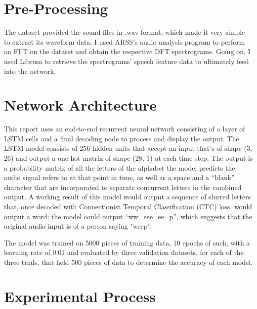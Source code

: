 \section{Pre-Processing}

The dataset provided the sound files in .wav format, which made it very simple to extract its waveform data. I used ARSS’s audio analysis program to perform an FFT on the dataset and obtain the respective DFT spectrograms. Going on, I used Librosa to retrieve the spectrograms' speech feature data to ultimately feed into the network.

\section{Network Architecture}

This report uses an end-to-end recurrent neural network consisting of a layer of LSTM cells and a final decoding node to process and display the output. The LSTM model consists of 256 hidden units that accept an input that's of shape (3, 26) and output a one-hot matrix of shape (28, 1) at each time step. The output is a probability matrix of all the letters of the alphabet the model predicts the audio signal refers to at that point in time, as well as a space and a “blank” character that are incorporated to separate concurrent letters in the combined output. A working result of this model would output a sequence of slurred letters that, once decoded with Connectionist Temporal Classification (CTC) loss, would output a word; the model could output “ww\_eee\_ee\_p”, which suggests that the original audio input is of a person saying "weep”. 
\par
The model was trained on 5000 pieces of training data, 10 epochs of such, with a learning rate of 0.01 and evaluated by three validation datasets, for each of the three trials, that held 500 pieces of data to determine the accuracy of each model.

\section{Experimental Process}

